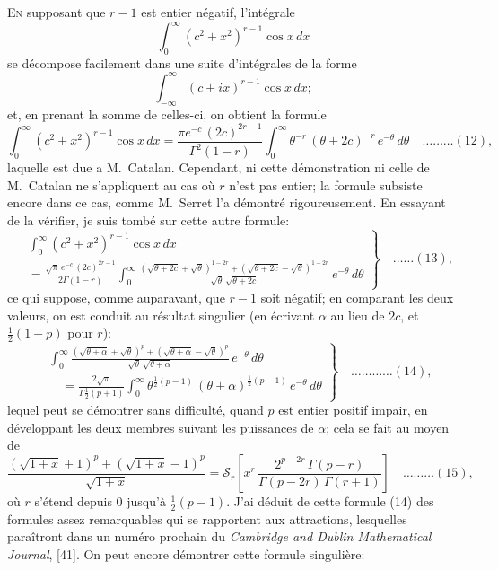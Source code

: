 \documentclass[11pt,a4paper]{book}
\begin{document}
\textsc{En} supposant que $r - 1$ est entier n\'egatif, l'int\'egrale
\[
\int_0^{\infty} (c^2 + x^2)^{r-1} \cos x \, dx
\]
se d\'ecompose facilement dans une suite d'int\'egrales de la forme
\[
\int_{-\infty}^{\infty} (c \pm ix)^{r-1} \cos x \, dx;
\]
et, en prenant la somme de celles-ci, on obtient la formule
\[
\int_0^{\infty} (c^2 + x^2)^{r-1} \cos x \, dx = \frac{\pi e^{-c}\, (2c)^{2r-1}}{\Gamma^2(1-r)} \int_0^{\infty} \theta^{-r}\,(\theta + 2c)^{-r}\, e^{-\theta}\, d\theta \quad \ldots \ldots \ldots (12),
\]
laquelle est due a M.~Catalan. Cependant, ni cette d\'emonstration ni celle de M.~Catalan ne s'appliquent au cas o\`u $r$ n'est pas entier; la formule subsiste encore dans ce cas, comme M.~Serret l'a d\'emontr\'e rigoureusement. En essayant de la v\'erifier, je suis tomb\'e sur cette autre formule:
\[
\left. \begin{aligned}
&\int_0^{\infty} (c^2 + x^2)^{r-1} \cos x \, dx \\
&= \frac{\sqrt{\pi}\, e^{-c}\, (2c)^{2r-1}}{2\Gamma(1-r)} \int_0^{\infty} \frac{(\sqrt{\theta + 2c} + \sqrt{\theta})^{1-2r} + (\sqrt{\theta + 2c} - \sqrt{\theta})^{1-2r}}{\sqrt{\theta}\, \sqrt{\theta + 2c}} \, e^{-\theta}\, d\theta
\end{aligned} \right\} \quad \ldots \ldots (13),
\]
ce qui suppose, comme auparavant, que $r - 1$ soit n\'egatif; en comparant les deux valeurs, on est conduit au r\'esultat singulier (en \'ecrivant $\alpha$ au lieu de $2c$, et $\frac{1}{2}(1-p)$ pour $r$):
\[
\left. \begin{aligned}
&\int_0^{\infty} \frac{(\sqrt{\theta + \alpha} + \sqrt{\theta})^p + (\sqrt{\theta + \alpha} - \sqrt{\theta})^p}{\sqrt{\theta}\, \sqrt{\theta + \alpha}} \, e^{-\theta}\, d\theta \\
&\quad = \frac{2\sqrt{\pi}}{\Gamma\frac{1}{2}(p+1)} \int_0^{\infty} \theta^{\frac{1}{2}(p-1)}\, (\theta + \alpha)^{\frac{1}{2}(p-1)}\, e^{-\theta}\, d\theta
\end{aligned} \right\} \quad \ldots \ldots \ldots \ldots (14),
\]
lequel peut se d\'emontrer sans difficult\'e, quand $p$ est entier positif impair, en d\'eveloppant les deux membres suivant les puissances de $\alpha$; cela se fait au moyen de
\[
\frac{(\sqrt{1+x} + 1)^p + (\sqrt{1+x} - 1)^p}{\sqrt{1+x}} = \mathcal{S}_r \left[ x^r \, \frac{2^{p-2r}\, \Gamma(p-r)}{\Gamma(p-2r)\, \Gamma(r+1)} \right] \quad \ldots \ldots \ldots (15),
\]
o\`u $r$ s'\'etend depuis $0$ jusqu'\`a $\frac{1}{2}(p-1)$. J'ai d\'eduit de cette formule (14) des formules assez remarquables qui se rapportent aux attractions, lesquelles para\^itront dans un num\'ero prochain du \textit{Cambridge and Dublin Mathematical Journal}, [41]. On peut encore d\'emontrer cette formule singuli\`ere:
\end{document}
